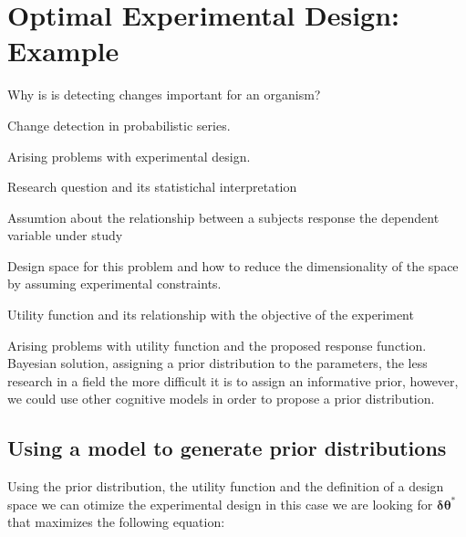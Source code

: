 \documentclass[preprint,review,12pt]{elsarticle}
\begin{document}


\section{Optimal Experimental Design: Example}
\label{S:2}

Why is is detecting changes important for an organism?

Change detection in probabilistic series.

Arising problems with experimental design.

Research question and its statistichal interpretation

Assumtion about the relationship between a subjects response the dependent variable under study

Design space for this problem and how to reduce the dimensionality of the space by assuming experimental constraints.

Utility function and its relationship with the objective of the experiment

Arising problems with utility function and the proposed response function. Bayesian solution, assigning a prior distribution to the parameters, the less research in a field the more difficult it is to assign an informative prior, however, we could use other cognitive models in order to propose a prior distribution. 
\subsection{Using a model to generate prior distributions}

Using the prior distribution, the utility function and the definition of a design space we can otimize the experimental design in this case we are looking for \begin{math}\mathbf{\delta\theta}^{*}\end{math} that maximizes the following equation:
\end{document}
